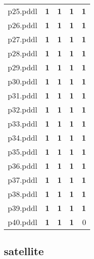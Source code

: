 \documentclass{article}
\begin{document}
\begin{tabular}{@{}lrrrr@{}}
p25.pddl & \textbf{1} & \textbf{1} & \textbf{1} & \textbf{1} \\
p26.pddl & \textbf{1} & \textbf{1} & \textbf{1} & \textbf{1} \\
p27.pddl & \textbf{1} & \textbf{1} & \textbf{1} & \textbf{1} \\
p28.pddl & \textbf{1} & \textbf{1} & \textbf{1} & \textbf{1} \\
p29.pddl & \textbf{1} & \textbf{1} & \textbf{1} & \textbf{1} \\
p30.pddl & \textbf{1} & \textbf{1} & \textbf{1} & \textbf{1} \\
p31.pddl & \textbf{1} & \textbf{1} & \textbf{1} & \textbf{1} \\
p32.pddl & \textbf{1} & \textbf{1} & \textbf{1} & \textbf{1} \\
p33.pddl & \textbf{1} & \textbf{1} & \textbf{1} & \textbf{1} \\
p34.pddl & \textbf{1} & \textbf{1} & \textbf{1} & \textbf{1} \\
p35.pddl & \textbf{1} & \textbf{1} & \textbf{1} & \textbf{1} \\
p36.pddl & \textbf{1} & \textbf{1} & \textbf{1} & \textbf{1} \\
p37.pddl & \textbf{1} & \textbf{1} & \textbf{1} & \textbf{1} \\
p38.pddl & \textbf{1} & \textbf{1} & \textbf{1} & \textbf{1} \\
p39.pddl & \textbf{1} & \textbf{1} & \textbf{1} & \textbf{1} \\
p40.pddl & \textbf{1} & \textbf{1} & \textbf{1} & 0 \\
\end{tabular}

\hypertarget{coverage-satellite}{}
\subsection*{satellite}
\end{document}
